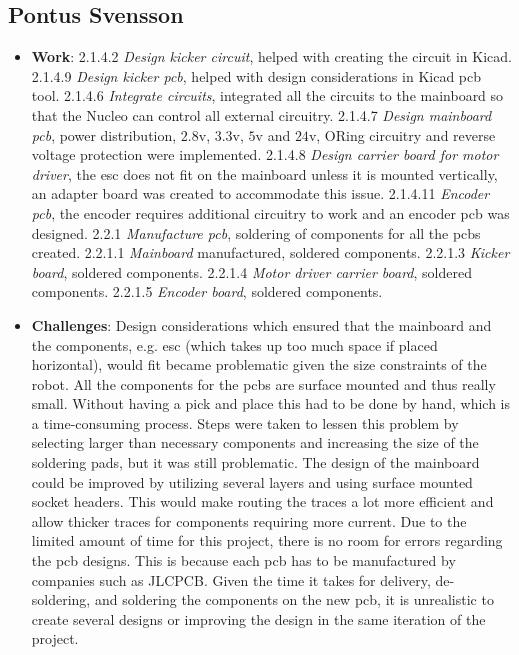 \subsection*{Pontus Svensson}
\begin{itemize}
    \item \textbf{Work}: 2.1.4.2 \textit{Design kicker circuit}, helped with creating the circuit in Kicad. 2.1.4.9 \textit{Design kicker \acs{pcb}}, helped with design considerations in Kicad \acs{pcb} tool. 2.1.4.6 \textit{Integrate circuits}, integrated all the circuits to the mainboard so that the Nucleo can control all external circuitry. 2.1.4.7 \textit{Design mainboard \acs{pcb}}, power distribution, $2.8$\:\ac{v}, $3.3$\:\ac{v}, $5$\:\ac{v} and $24$\:\ac{v}, ORing circuitry and reverse voltage protection were implemented. 2.1.4.8 \textit{Design carrier board for motor driver}, the \ac{esc} does not fit on the mainboard unless it is mounted vertically, an adapter board was created to accommodate this issue. 2.1.4.11 \textit{Encoder \acs{pcb}}, the encoder requires additional circuitry to work and an encoder \ac{pcb} was designed. 2.2.1 \textit{Manufacture \acs{pcb}}, soldering of components for all the \acp{pcb} created. 2.2.1.1 \textit{Mainboard} manufactured, soldered components. 2.2.1.3 \textit{Kicker board}, soldered components. 2.2.1.4 \textit{Motor driver carrier board}, soldered components. 2.2.1.5 \textit{Encoder board}, soldered components.

    \item \textbf{Challenges}: Design considerations which ensured that the mainboard and the components, e.g. \ac{esc} (which takes up too much space if placed horizontal), would fit became problematic given the size constraints of the robot. All the components for the \acp{pcb} are surface mounted and thus really small. Without having a pick and place this had to be done by hand, which is a time-consuming process. Steps were taken to lessen this problem by selecting larger than necessary components and increasing the size of the soldering pads, but it was still problematic. The design of the mainboard could be improved by utilizing several layers and using surface mounted socket headers. This would make routing the traces a lot more efficient and allow thicker traces for components requiring more current.
    Due to the limited amount of time for this project, there is no room for errors regarding the \ac{pcb} designs. This is because each \ac{pcb} has to be manufactured by companies such as JLCPCB. Given the time it takes for delivery, de-soldering, and soldering the components on the new \ac{pcb}, it is unrealistic to create several designs or improving the design in the same iteration of the project. 
    

\end{itemize}
